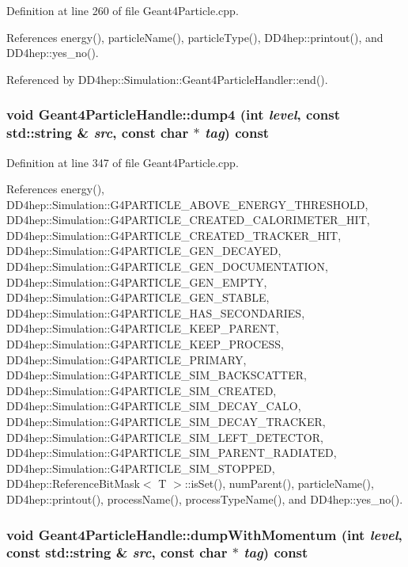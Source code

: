 Definition at line 260 of file Geant4Particle.cpp.

References energy(), particleName(), particleType(), DD4hep::printout(), and DD4hep::yes\_\-no().

Referenced by DD4hep::Simulation::Geant4ParticleHandler::end().\hypertarget{class_d_d4hep_1_1_simulation_1_1_geant4_particle_handle_a41a398ac0a722fef6b3837bc559fb0e5}{
\subsubsection[{dump4}]{\setlength{\rightskip}{0pt plus 5cm}void Geant4ParticleHandle::dump4 (int {\em level}, \/  const std::string \& {\em src}, \/  const char $\ast$ {\em tag}) const}}
\label{class_d_d4hep_1_1_simulation_1_1_geant4_particle_handle_a41a398ac0a722fef6b3837bc559fb0e5}


Definition at line 347 of file Geant4Particle.cpp.

References energy(), DD4hep::Simulation::G4PARTICLE\_\-ABOVE\_\-ENERGY\_\-THRESHOLD, DD4hep::Simulation::G4PARTICLE\_\-CREATED\_\-CALORIMETER\_\-HIT, DD4hep::Simulation::G4PARTICLE\_\-CREATED\_\-TRACKER\_\-HIT, DD4hep::Simulation::G4PARTICLE\_\-GEN\_\-DECAYED, DD4hep::Simulation::G4PARTICLE\_\-GEN\_\-DOCUMENTATION, DD4hep::Simulation::G4PARTICLE\_\-GEN\_\-EMPTY, DD4hep::Simulation::G4PARTICLE\_\-GEN\_\-STABLE, DD4hep::Simulation::G4PARTICLE\_\-HAS\_\-SECONDARIES, DD4hep::Simulation::G4PARTICLE\_\-KEEP\_\-PARENT, DD4hep::Simulation::G4PARTICLE\_\-KEEP\_\-PROCESS, DD4hep::Simulation::G4PARTICLE\_\-PRIMARY, DD4hep::Simulation::G4PARTICLE\_\-SIM\_\-BACKSCATTER, DD4hep::Simulation::G4PARTICLE\_\-SIM\_\-CREATED, DD4hep::Simulation::G4PARTICLE\_\-SIM\_\-DECAY\_\-CALO, DD4hep::Simulation::G4PARTICLE\_\-SIM\_\-DECAY\_\-TRACKER, DD4hep::Simulation::G4PARTICLE\_\-SIM\_\-LEFT\_\-DETECTOR, DD4hep::Simulation::G4PARTICLE\_\-SIM\_\-PARENT\_\-RADIATED, DD4hep::Simulation::G4PARTICLE\_\-SIM\_\-STOPPED, DD4hep::ReferenceBitMask$<$ T $>$::isSet(), numParent(), particleName(), DD4hep::printout(), processName(), processTypeName(), and DD4hep::yes\_\-no().\hypertarget{class_d_d4hep_1_1_simulation_1_1_geant4_particle_handle_a5f6c53624438fd86c2455deb22cab98a}{
\subsubsection[{dumpWithMomentum}]{\setlength{\rightskip}{0pt plus 5cm}void Geant4ParticleHandle::dumpWithMomentum (int {\em level}, \/  const std::string \& {\em src}, \/  const char $\ast$ {\em tag}) const}}
\label{class_d_d4hep_1_1_simulation_1_1_geant4_particle_handle_a5f6c53624438fd86c2455deb22cab98a}


